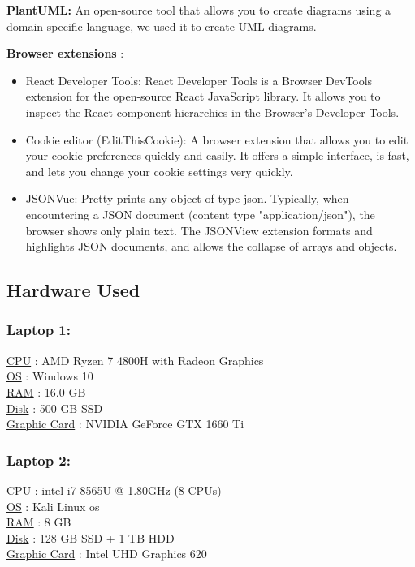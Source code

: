 \documentclass[]{uc2pfecaneva}
\begin{document}
    \noindent
    \textbf{PlantUML: }  An open-source tool that allows you to create diagrams using a domain-specific language, we used it to create UML diagrams. 

     \textbf{Browser extensions }:
    \begin{itemize}
        \item  React Developer Tools: React Developer Tools is a Browser DevTools extension for the open-source React JavaScript library.
        It allows you to inspect the React component hierarchies in the Browser’s Developer Tools.
        \item Cookie editor (EditThisCookie):  A browser extension that allows you to edit your cookie preferences quickly and easily.
        It offers a simple interface, is fast, and lets you change your cookie settings very quickly.
        \item  JSONVue: Pretty prints any object of type json.
        Typically, when encountering a JSON document (content type "application/json"), the browser shows only plain text.
        The JSONView extension formats and highlights JSON documents, and allows the collapse of arrays and objects.

    \end{itemize}

    \clearpage
    \subsection{Hardware Used}

    \subsubsection{Laptop 1: }
    \underline{CPU} : AMD Ryzen 7 4800H with Radeon Graphics \\
    \underline{OS} :  Windows 10 \\
    \underline{RAM} :  16.0 GB \\
    \underline{Disk} :  500 GB SSD \\
    \underline{Graphic Card} : NVIDIA GeForce GTX 1660 Ti
    \subsubsection{Laptop 2: }
    \underline{CPU} :  intel i7-8565U @ 1.80GHz (8 CPUs) \\
    \underline{OS} :  Kali Linux os \\
    \underline{RAM} : 8 GB \\
    \underline{Disk} :  128 GB SSD + 1 TB HDD \\
    \underline{Graphic Card} :  Intel UHD Graphics 620
\end{document}
